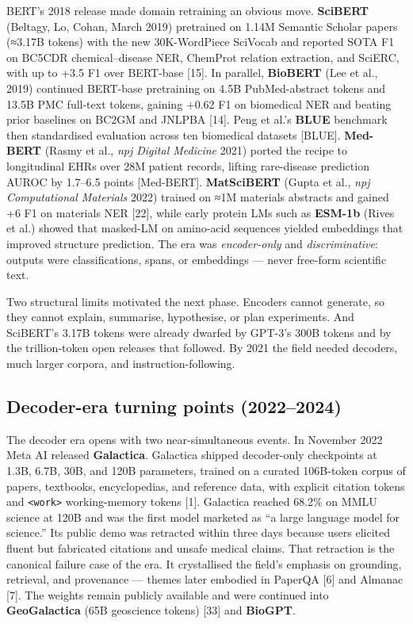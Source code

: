 BERT's 2018 release made domain retraining an obvious move. \textbf{SciBERT} (Beltagy, Lo, Cohan, March 2019) pretrained on 1.14M Semantic Scholar papers (≈3.17B tokens) with the new 30K-WordPiece SciVocab and reported SOTA F1 on BC5CDR chemical--disease NER, ChemProt relation extraction, and SciERC, with up to +3.5 F1 over BERT-base {[}15{]}. In parallel, \textbf{BioBERT} (Lee et al., 2019) continued BERT-base pretraining on 4.5B PubMed-abstract tokens and 13.5B PMC full-text tokens, gaining +0.62 F1 on biomedical NER and beating prior baselines on BC2GM and JNLPBA {[}14{]}. Peng et al.'s \textbf{BLUE} benchmark then standardised evaluation across ten biomedical datasets {[}BLUE{]}. \textbf{Med-BERT} (Rasmy et al., \emph{npj Digital Medicine} 2021) ported the recipe to longitudinal EHRs over 28M patient records, lifting rare-disease prediction AUROC by 1.7--6.5 points {[}Med-BERT{]}. \textbf{MatSciBERT} (Gupta et al., \emph{npj Computational Materials} 2022) trained on ≈1M materials abstracts and gained +6 F1 on materials NER {[}22{]}, while early protein LMs such as \textbf{ESM-1b} (Rives et al.) showed that masked-LM on amino-acid sequences yielded embeddings that improved structure prediction. The era was \emph{encoder-only} and \emph{discriminative}: outputs were classifications, spans, or embeddings --- never free-form scientific text.

Two structural limits motivated the next phase. Encoders cannot generate, so they cannot explain, summarise, hypothesise, or plan experiments. And SciBERT's 3.17B tokens were already dwarfed by GPT-3's 300B tokens and by the trillion-token open releases that followed. By 2021 the field needed decoders, much larger corpora, and instruction-following.

\subsection{Decoder-era turning points (2022--2024)}\label{decoder-era-turning-points-20222024}

The decoder era opens with two near-simultaneous events. In November 2022 Meta AI released \textbf{Galactica}. Galactica shipped decoder-only checkpoints at 1.3B, 6.7B, 30B, and 120B parameters, trained on a curated 106B-token corpus of papers, textbooks, encyclopedias, and reference data, with explicit citation tokens and \texttt{\textless{}work\textgreater{}} working-memory tokens {[}1{]}. Galactica reached 68.2\% on MMLU science at 120B and was the first model marketed as ``a large language model for science.'' Its public demo was retracted within three days because users elicited fluent but fabricated citations and unsafe medical claims. That retraction is the canonical failure case of the era. It crystallised the field's emphasis on grounding, retrieval, and provenance --- themes later embodied in PaperQA {[}6{]} and Almanac {[}7{]}. The weights remain publicly available and were continued into \textbf{GeoGalactica} (65B geoscience tokens) {[}33{]} and \textbf{BioGPT}.

